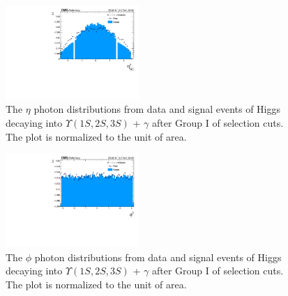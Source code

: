 \begin{figure}[!htbp]
\begin{center}
\includegraphics[width=0.45\textwidth]{figures_and_tables/outputPlots/HtoUpsilon_Cat0_ZZZZZ/au/data_x_mc/noKinCuts/h_noKin_Photon_eta}\hspace*{1.cm}
\end{center}\vspace*{-.5cm}
\caption{The $\eta$ photon distributions from data and signal events of Higgs decaying into $\Upsilon(1S,2S,3S)$ + $\gamma$ after Group I of selection cuts. The plot is normalized to the unit of area.}
\label{fig:etaPhoton_HtoUpsilon_Cat0}
\end{figure}

\begin{figure}[!htbp]
\begin{center}
\includegraphics[width=0.45\textwidth]{figures_and_tables/outputPlots/HtoUpsilon_Cat0_ZZZZZ/au/data_x_mc/noKinCuts/h_noKin_Photon_phi}\hspace*{1.cm}
\end{center}\vspace*{-.5cm}
\caption{The $\phi$ photon distributions from data and signal events of Higgs decaying into $\Upsilon(1S,2S,3S)$ + $\gamma$ after Group I of selection cuts. The plot is normalized to the unit of area.}
\label{fig:phiPhoton_HtoUpsilon_Cat0}
\end{figure}

